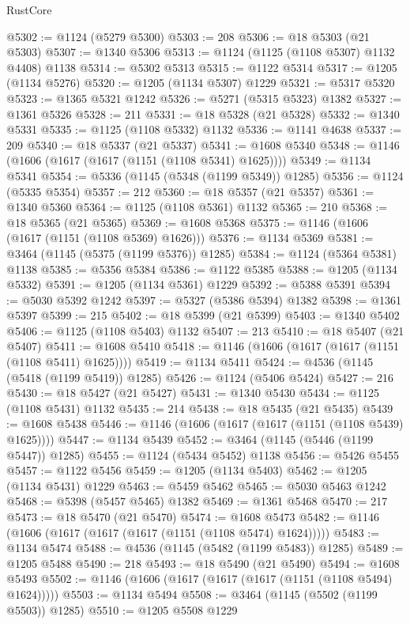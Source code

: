\begin{lexlean}{RustCore}
\begin{coremodule}
@5302 := @1124 (@5279 @5300)
@5303 := 208
@5306 := @18 @5303 (@21 @5303)
@5307 := @1340 @5306
@5313 := @1124 (@1125 (@1108 @5307) @1132 @4408) @1138
@5314 := @5302 @5313
@5315 := @1122 @5314
@5317 := @1205 (@1134 @5276)
@5320 := @1205 (@1134 @5307) @1229
@5321 := @5317 @5320
@5323 := @1365 @5321 @1242
@5326 := @5271 (@5315 @5323) @1382
@5327 := @1361 @5326
@5328 := 211
@5331 := @18 @5328 (@21 @5328)
@5332 := @1340 @5331
@5335 := @1125 (@1108 @5332) @1132
@5336 := @1141 @4638
@5337 := 209
@5340 := @18 @5337 (@21 @5337)
@5341 := @1608 @5340
@5348 := @1146 (@1606 (@1617 (@1617 (@1151 (@1108 @5341) @1625))))
@5349 := @1134 @5341
@5354 := @5336 (@1145 (@5348 (@1199 @5349)) @1285)
@5356 := @1124 (@5335 @5354)
@5357 := 212
@5360 := @18 @5357 (@21 @5357)
@5361 := @1340 @5360
@5364 := @1125 (@1108 @5361) @1132
@5365 := 210
@5368 := @18 @5365 (@21 @5365)
@5369 := @1608 @5368
@5375 := @1146 (@1606 (@1617 (@1151 (@1108 @5369) @1626)))
@5376 := @1134 @5369
@5381 := @3464 (@1145 (@5375 (@1199 @5376)) @1285)
@5384 := @1124 (@5364 @5381) @1138
@5385 := @5356 @5384
@5386 := @1122 @5385
@5388 := @1205 (@1134 @5332)
@5391 := @1205 (@1134 @5361) @1229
@5392 := @5388 @5391
@5394 := @5030 @5392 @1242
@5397 := @5327 (@5386 @5394) @1382
@5398 := @1361 @5397
@5399 := 215
@5402 := @18 @5399 (@21 @5399)
@5403 := @1340 @5402
@5406 := @1125 (@1108 @5403) @1132
@5407 := 213
@5410 := @18 @5407 (@21 @5407)
@5411 := @1608 @5410
@5418 := @1146 (@1606 (@1617 (@1617 (@1151 (@1108 @5411) @1625))))
@5419 := @1134 @5411
@5424 := @4536 (@1145 (@5418 (@1199 @5419)) @1285)
@5426 := @1124 (@5406 @5424)
@5427 := 216
@5430 := @18 @5427 (@21 @5427)
@5431 := @1340 @5430
@5434 := @1125 (@1108 @5431) @1132
@5435 := 214
@5438 := @18 @5435 (@21 @5435)
@5439 := @1608 @5438
@5446 := @1146 (@1606 (@1617 (@1617 (@1151 (@1108 @5439) @1625))))
@5447 := @1134 @5439
@5452 := @3464 (@1145 (@5446 (@1199 @5447)) @1285)
@5455 := @1124 (@5434 @5452) @1138
@5456 := @5426 @5455
@5457 := @1122 @5456
@5459 := @1205 (@1134 @5403)
@5462 := @1205 (@1134 @5431) @1229
@5463 := @5459 @5462
@5465 := @5030 @5463 @1242
@5468 := @5398 (@5457 @5465) @1382
@5469 := @1361 @5468
@5470 := 217
@5473 := @18 @5470 (@21 @5470)
@5474 := @1608 @5473
@5482 := @1146 (@1606 (@1617 (@1617 (@1617 (@1151 (@1108 @5474) @1624)))))
@5483 := @1134 @5474
@5488 := @4536 (@1145 (@5482 (@1199 @5483)) @1285)
@5489 := @1205 @5488
@5490 := 218
@5493 := @18 @5490 (@21 @5490)
@5494 := @1608 @5493
@5502 := @1146 (@1606 (@1617 (@1617 (@1617 (@1151 (@1108 @5494) @1624)))))
@5503 := @1134 @5494
@5508 := @3464 (@1145 (@5502 (@1199 @5503)) @1285)
@5510 := @1205 @5508 @1229

\end{coremodule}
\end{lexlean}

